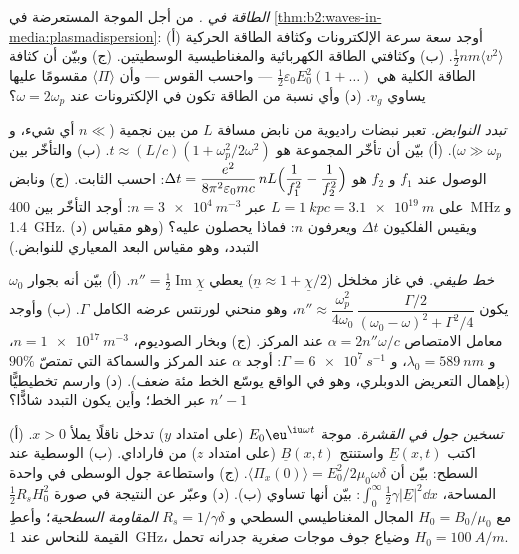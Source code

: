 \begin{exercise}[$\star\star$]\label{exo:b2:waves-in-media:7}
\emph{الطاقة في .} من أجل الموجة المستعرضة في
\cref{thm:b2:waves-in-media:plasmadispersion}: (أ) أوجد سعة سرعة
الإلكترونات وكثافة الطاقة الحركية $\tfrac12nm\langle v^2\rangle$. (ب)
وكثافتي الطاقة الكهربائية والمغناطيسية الوسطيتين. (ج) وبيّن أن كثافة
الطاقة الكلية هي $\tfrac12\varepsilon_0E_0^2(1 + \dots)$ --- واحسب القوس ---
وأن $\langle\Pi\rangle$ مقسومًا عليها يساوي $v_g$. (د) وأي نسبة من
الطاقة تكون في الإلكترونات عند $\omega = 2\omega_p$؟
\end{exercise}

\begin{exercise}[$\star\star$]\label{exo:b2:waves-in-media:8}
\emph{تبدد النوابض.} تعبر نبضات راديوية من نابض مسافة
$L$ من  بين نجمية ($n \ll$ أي شيء، و $\omega \gg \omega_p$). (أ) بيّن
أن تأخّر المجموعة هو $t \approx (L/c)(1 + \omega_p^2/2\omega^2)$. (ب) والتأخّر
بين الوصول عند $f_1$ و $f_2$ هو $\Delta t = \dfrac{e^2}{8\pi^2
\varepsilon_0mc}\,nL\Bigl(\dfrac1{f_1^2} - \dfrac1{f_2^2}\Bigr)$: احسب الثابت.
(ج) ونابض على $L = \qty{1}{kpc} = \qty{3.1e19}{m}$ عبر $n = \qty{3e4}{m^{-3}}$:
أوجد التأخّر بين \qty{400}{MHz} و \qty{1.4}{GHz}. (د) ويقيس الفلكيون
$\Delta t$ ويعرفون $n$: فماذا يحصلون عليه؟ (وهو مقياس التبدد، وهو
مقياس البعد المعياري للنوابض.)
\end{exercise}

\begin{exercise}[$\star\star$]\label{exo:b2:waves-in-media:9}
\emph{خط طيفي.} في غاز مخلخل ($\underline n \approx 1 + \underline\chi/2$) يعطي
 $n'' = \tfrac12\operatorname{Im}\underline\chi$. (أ) بيّن أنه بجوار
$\omega_0$ يكون $n'' \approx \dfrac{\omega_p^2}{4\omega_0}\,\dfrac{\Gamma/2}{(\omega_0 - \omega)^2 + \Gamma^2/4}$، وهو
منحني لورنتس عرضه الكامل $\Gamma$. (ب) وأوجد معامل الامتصاص $\alpha = 2n''\omega/c$
عند المركز. (ج) وبخار الصوديوم، $n = \qty{1e17}{m^{-3}}$، و $\lambda_0 = \qty{589}{nm}$،
و $\Gamma = \qty{6e7}{s^{-1}}$: أوجد $\alpha$ عند المركز والسماكة التي تمتصّ
$90\%$ (بإهمال التعريض الدوبلري، وهو في الواقع يوسّع الخط
مئة ضعف). (د) وارسم تخطيطيًّا $n' - 1$ عبر الخط؛ وأين يكون
التبدد شاذًّا؟
\end{exercise}

\begin{exercise}[$\star\star\star$]\label{exo:b2:waves-in-media:10}
\emph{تسخين جول في القشرة.} موجة $E_0\eu^{\iu\omega t}$ (على امتداد $y$)
تدخل ناقلًا يملأ $x > 0$. (أ) اكتب $\underline E(x, t)$ واستنتج
$\underline B(x, t)$ (على امتداد $z$) من فاراداي. (ب)  الوسطية عند
السطح: بيّن أن $\langle\Pi_x(0)\rangle = E_0^2/2\mu_0\omega\delta$. (ج) واستطاعة جول
الوسطى في واحدة المساحة، $\int_0^\infty\tfrac12\gamma|\underline E|^2\dd x$: بيّن أنها تساوي
(ب). (د) وعبّر عن النتيجة في صورة $\tfrac12R_sH_0^2$ مع $H_0 = B_0/\mu_0$ المجال
المغناطيسي السطحي و $R_s = 1/\gamma\delta$ \emph{المقاومة
السطحية}؛ وأعطِ القيمة للنحاس عند \qty{1}{GHz}، وضياع
جوف موجات صغرية جدرانه تحمل $H_0 = \qty{100}{A/m}$.
\end{exercise}


